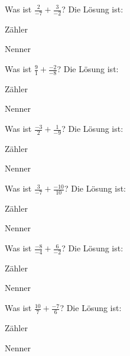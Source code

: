 \documentclass{ximera}
\begin{document}
\begin{shuffle}
\begin{question}
Was ist $\frac{2}{-7} + \frac{3}{-2}$?
Die Lösung ist:
\begin{solution}
Zähler 
\end{solution}
\begin{solution}
Nenner 
\end{solution}
\end{question}


\begin{question}
Was ist $\frac{9}{1} + \frac{-2}{-8}$?
Die Lösung ist:
\begin{solution}
Zähler 
\end{solution}
\begin{solution}
Nenner 
\end{solution}
\end{question}


\begin{question}
Was ist $\frac{-3}{2} + \frac{1}{-9}$?
Die Lösung ist:
\begin{solution}
Zähler 
\end{solution}
\begin{solution}
Nenner 
\end{solution}
\end{question}


\begin{question}
Was ist $\frac{3}{-7} + \frac{-10}{10}$?
Die Lösung ist:
\begin{solution}
Zähler 
\end{solution}
\begin{solution}
Nenner 
\end{solution}
\end{question}


\begin{question}
Was ist $\frac{-8}{-4} + \frac{6}{-2}$?
Die Lösung ist:
\begin{solution}
Zähler 
\end{solution}
\begin{solution}
Nenner 
\end{solution}
\end{question}


\begin{question}
Was ist $\frac{10}{7} + \frac{-7}{6}$?
Die Lösung ist:
\begin{solution}
Zähler 
\end{solution}
\begin{solution}
Nenner 
\end{solution}
\end{question}



\end{shuffle}
\end{document}

